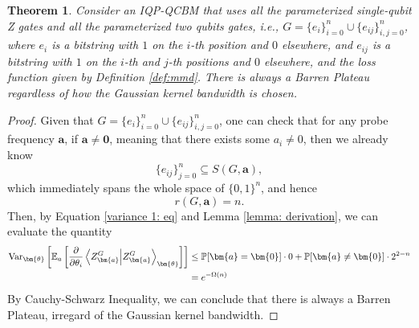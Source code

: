 \documentclass[a4paper,onecolumn,notitlepage,nofootinbib,longbibliography,superscriptaddress, floatfix, pra, aps, 10pt]{revtex4-2}
\newcommand{\vttheta}{{\bm{\theta}}}
\newcommand{\vta}{{\bm{a}}}
\newtheorem{theorem}{Theorem}
\begin{document}
\begin{theorem}
Consider an IQP-QCBM that uses all the parameterized single-qubit Z gates and all the parameterized two qubits gates, i.e., $G=\{e_i\}_{i=0}^n \cup \{e_{ij}\}_{i,j=0}^n $, where $e_i$ is a bitstring with $1$ on the $i$-th position and $0$ elsewhere, and $e_{ij}$ is a bitstring with $1$ on the $i$-th and $j$-th positions and $0$ elsewhere, and the loss function given by Definition \ref{def:mmd}. There is always a Barren Plateau regardless of how the Gaussian kernel bandwidth is chosen.
\end{theorem}
\begin{proof}
Given that $G=\{e_i\}_{i=0}^n \cup \{e_{ij}\}_{i,j=0}^n $, one can check that for any probe frequency $\vta$, if $\vta\neq \bm{0}$, meaning that there exists some $a_i \neq 0$, then we already know \begin{equation}
    \{e_{ij}\}_{j=0}^n \subseteq S(G,\vta),
\end{equation}
which immediately spans the whole space of $\{0,1\}^n$, and hence 
\begin{equation}r(G,\vta)=n.\end{equation} 
Then, by Equation \ref{variance 1: eq} and Lemma \ref{lemma: derivation}, we can evaluate the quantity \begin{align}
\operatorname{Var}_\vttheta \left[\mathbb{E}_a\left[\frac{\partial}{\partial \theta_i} \braket{Z^G_\vta}_\vttheta \right]
 \right] & \leq \mathbb{P}[\vta=\bm{0}] \cdot 0 + \mathbb{P}[\vta \neq \bm{0}] \cdot 2^{2-n} \\
 & = e^{-\Omega(n)}
\end{align}
By Cauchy-Schwarz Inequality, we can conclude that there is always a Barren Plateau, irregard of the Gaussian kernel bandwidth.
\end{proof}
\end{document}
